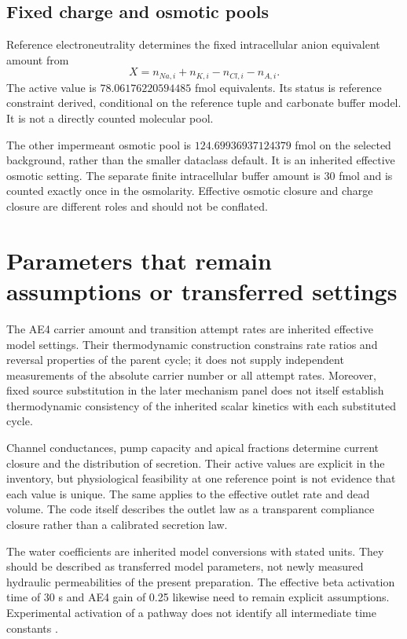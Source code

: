 \subsection{Fixed charge and osmotic pools}
Reference electroneutrality determines the fixed intracellular anion equivalent amount from
\[
 X=n_{Na,i}+n_{K,i}-n_{Cl,i}-n_{A,i}.
\]
The active value is $78.06176220594485$ fmol equivalents. Its status is reference constraint derived, conditional on the reference tuple and carbonate buffer model. It is not a directly counted molecular pool.

The other impermeant osmotic pool is $124.69936937124379$ fmol on the selected background, rather than the smaller dataclass default. It is an inherited effective osmotic setting. The separate finite intracellular buffer amount is 30 fmol and is counted exactly once in the osmolarity. Effective osmotic closure and charge closure are different roles and should not be conflated.

\section{Parameters that remain assumptions or transferred settings}
The AE4 carrier amount and transition attempt rates are inherited effective model settings. Their thermodynamic construction constrains rate ratios and reversal properties of the parent cycle; it does not supply independent measurements of the absolute carrier number or all attempt rates. Moreover, fixed source substitution in the later mechanism panel does not itself establish thermodynamic consistency of the inherited scalar kinetics with each substituted cycle.

Channel conductances, pump capacity and apical fractions determine current closure and the distribution of secretion. Their active values are explicit in the inventory, but physiological feasibility at one reference point is not evidence that each value is unique. The same applies to the effective outlet rate and dead volume. The code itself describes the outlet law as a transparent compliance closure rather than a calibrated secretion law.

The water coefficients are inherited model conversions with stated units. They should be described as transferred model parameters, not newly measured hydraulic permeabilities of the present preparation. The effective beta activation time of 30 s and AE4 gain of 0.25 likewise need to remain explicit assumptions. Experimental activation of a pathway does not identify all intermediate time constants \citep{p43Pena2021}.

